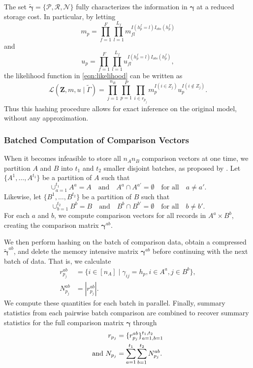 \documentclass[12pt,letterpaper]{article}
\newcommand{\1}[1]{\mathbb{I}\!\left[#1\right]} %
\begin{document}
The set $\tilde{\bm{\gamma}}=\{ \mathcal{P}, \mathcal{R},\mathcal{N}\}$ fully characterizes the information in $\bm{\gamma}$ at a reduced storage cost. In particular, by letting 
\[
m_p = \prod_{f=1}^F\prod_{l=1}^{L_f} m_{fl}^{I(h_p^{f}=l)I_{obs}(h_p^{f})}
\]
and
\[
u_p = \prod_{f=1}^F\prod_{l=1}^{L_f} u_{fl}^{I(h_p^{f}=l)I_{obs}(h_p^{f})},
\]
the likelihood function in \eqref{eqn:likelihood} can be written as
\begin{equation}
	\label{eq:likelihood-hash}
	\mathcal{L}(\bm{Z}, m,u\mid\tilde{\Gamma})=\prod_{j=1}^{n_B}\prod_{p=1}^{P}\prod_{i\in r_{p_j}}m_p^{I(i \in Z_j)}u_{p}^{I(i \notin Z_j)}.
\end{equation}
Thus this hashing procedure allows for exact inference on the original model, without any approximation.

\subsubsection{Batched Computation of Comparison Vectors} \label{app:batching}
When it becomes infeasible to store all $n_A  n_B$ comparison vectors at one time, we partition $A$ and $B$ into $t_1$ and $t_2$ smaller disjoint batches, as proposed by \cite{kundinger_2023}. Let $\{A^1, \dots, A^{t_1}\}$ be a partition of $A$ such that 
$$\cup_{a=1}^{t_1} A^a = A \quad \text{and} \quad A^a \cap A^{a'}=\emptyset \quad \text{for all} \quad a \neq a'.$$  Likewise, let $\{B^1, \dots, B^{t_2}\}$ be a partition of $B$ such that 
$$\cup_{b=1}^{t_2} B^b = B \quad \text{and} \quad B^b \cap B^{b'}=\emptyset \quad \text{for all} \quad b \neq b'.$$ For each $a$ and $b$, we compute comparison vectors for all records in $A^a \times B^b$, creating the comparison matrix $\bm{\gamma}^{ab}$. 

We then perform hashing on the batch of comparison data, obtain a compressed $\tilde{\bm{\gamma}}^{ab}$, and delete the memory intensive matrix $\bm{\gamma}^{ab}$ before continuing with the next batch of data. That is, we calculate
\begin{align*}
	r_{p_j}^{ab} &= \{i \in [n_A]\mid \gamma_{ij} = h_p, i\in A^a, j \in B^b\}, \\
	N_{p_j}^{ab} &= |r_{p_j}^{ab}|.
\end{align*}
We compute these quantities for each batch in parallel. Finally, summary statistics from each pairwise batch comparison are combined to recover summary statistics for the full comparison matrix $\bm{\gamma}$ through
\begin{align}
	r_{p_j} &= \{r_{p_j}^{ab}\}_{a=1, b=1}^{t_1,t_2} \label{eq:rpj}  \\
	\text{and } N_{p_j} &= \sum_{a = 1}^{t_1} \sum_{b = 1}^{t_2} N_{p_j}^{ab}. \notag
\end{align}
\end{document}
